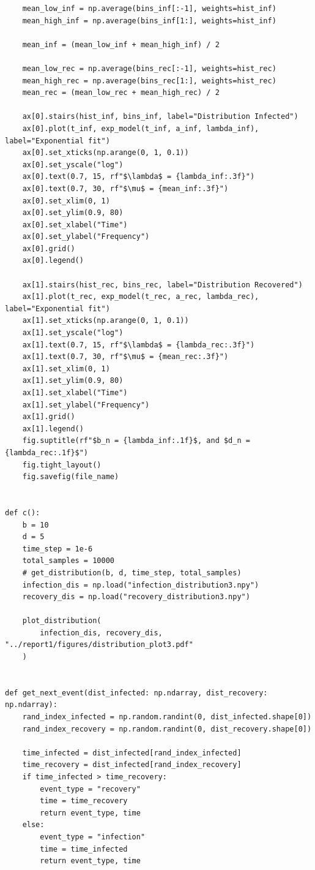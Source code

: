 \documentclass[15pt]{article}
\begin{document}
\begin{verbatim}
    mean_low_inf = np.average(bins_inf[:-1], weights=hist_inf)
    mean_high_inf = np.average(bins_inf[1:], weights=hist_inf)

    mean_inf = (mean_low_inf + mean_high_inf) / 2

    mean_low_rec = np.average(bins_rec[:-1], weights=hist_rec)
    mean_high_rec = np.average(bins_rec[1:], weights=hist_rec)
    mean_rec = (mean_low_rec + mean_high_rec) / 2

    ax[0].stairs(hist_inf, bins_inf, label="Distribution Infected")
    ax[0].plot(t_inf, exp_model(t_inf, a_inf, lambda_inf), label="Exponential fit")
    ax[0].set_xticks(np.arange(0, 1, 0.1))
    ax[0].set_yscale("log")
    ax[0].text(0.7, 15, rf"$\lambda$ = {lambda_inf:.3f}")
    ax[0].text(0.7, 30, rf"$\mu$ = {mean_inf:.3f}")
    ax[0].set_xlim(0, 1)
    ax[0].set_ylim(0.9, 80)
    ax[0].set_xlabel("Time")
    ax[0].set_ylabel("Frequency")
    ax[0].grid()
    ax[0].legend()

    ax[1].stairs(hist_rec, bins_rec, label="Distribution Recovered")
    ax[1].plot(t_rec, exp_model(t_rec, a_rec, lambda_rec), label="Exponential fit")
    ax[1].set_xticks(np.arange(0, 1, 0.1))
    ax[1].set_yscale("log")
    ax[1].text(0.7, 15, rf"$\lambda$ = {lambda_rec:.3f}")
    ax[1].text(0.7, 30, rf"$\mu$ = {mean_rec:.3f}")
    ax[1].set_xlim(0, 1)
    ax[1].set_ylim(0.9, 80)
    ax[1].set_xlabel("Time")
    ax[1].set_ylabel("Frequency")
    ax[1].grid()
    ax[1].legend()
    fig.suptitle(rf"$b_n = {lambda_inf:.1f}$, and $d_n = {lambda_rec:.1f}$")
    fig.tight_layout()
    fig.savefig(file_name)


def c():
    b = 10
    d = 5
    time_step = 1e-6
    total_samples = 10000
    # get_distribution(b, d, time_step, total_samples)
    infection_dis = np.load("infection_distribution3.npy")
    recovery_dis = np.load("recovery_distribution3.npy")

    plot_distribution(
        infection_dis, recovery_dis, "../report1/figures/distribution_plot3.pdf"
    )


def get_next_event(dist_infected: np.ndarray, dist_recovery: np.ndarray):
    rand_index_infected = np.random.randint(0, dist_infected.shape[0])
    rand_index_recovery = np.random.randint(0, dist_recovery.shape[0])

    time_infected = dist_infected[rand_index_infected]
    time_recovery = dist_infected[rand_index_recovery]
    if time_infected > time_recovery:
        event_type = "recovery"
        time = time_recovery
        return event_type, time
    else:
        event_type = "infection"
        time = time_infected
        return event_type, time



\end{verbatim}
\end{document}
